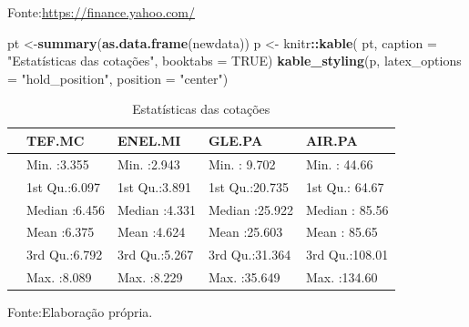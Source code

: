 \documentclass[
  12pt,
  a4paper,
  openany]{book}
\newenvironment{Shaded}{\begin{snugshade}}{\end{snugshade}}
\newcommand{\DataTypeTok}[1]{\textcolor[rgb]{0.13,0.29,0.53}{#1}}
\newcommand{\KeywordTok}[1]{\textcolor[rgb]{0.13,0.29,0.53}{\textbf{#1}}}
\newcommand{\NormalTok}[1]{#1}
\newcommand{\OperatorTok}[1]{\textcolor[rgb]{0.81,0.36,0.00}{\textbf{#1}}}
\newcommand{\OtherTok}[1]{\textcolor[rgb]{0.56,0.35,0.01}{#1}}
\newcommand{\StringTok}[1]{\textcolor[rgb]{0.31,0.60,0.02}{#1}}
\begin{document}
Fonte:\url{https://finance.yahoo.com/}

\justifying
\bigskip
\scriptsize

\begin{Shaded}
\begin{Highlighting}[]
\NormalTok{pt \textless{}{-}}\KeywordTok{summary}\NormalTok{(}\KeywordTok{as.data.frame}\NormalTok{(newdata))}
\NormalTok{p \textless{}{-}}\StringTok{ }\NormalTok{knitr}\OperatorTok{::}\KeywordTok{kable}\NormalTok{(}
\NormalTok{  pt, }\DataTypeTok{caption =} \StringTok{"Estatísticas das cotações"}\NormalTok{,}
  \DataTypeTok{booktabs =} \OtherTok{TRUE}\NormalTok{)}
\KeywordTok{kable\_styling}\NormalTok{(p, }\DataTypeTok{latex\_options =} \StringTok{"hold\_position"}\NormalTok{, }\DataTypeTok{position =} \StringTok{"center"}\NormalTok{)}
\end{Highlighting}
\end{Shaded}

\begin{table}[!h]

\caption{\label{tab:unnamed-chunk-6}Estatísticas das cotações}
\centering
\begin{tabular}[t]{lllll}
\toprule
  &     TEF.MC &    ENEL.MI &     GLE.PA &     AIR.PA\\
\midrule
 & Min.   :3.355 & Min.   :2.943 & Min.   : 9.702 & Min.   : 44.66\\
 & 1st Qu.:6.097 & 1st Qu.:3.891 & 1st Qu.:20.735 & 1st Qu.: 64.67\\
 & Median :6.456 & Median :4.331 & Median :25.922 & Median : 85.56\\
 & Mean   :6.375 & Mean   :4.624 & Mean   :25.603 & Mean   : 85.65\\
 & 3rd Qu.:6.792 & 3rd Qu.:5.267 & 3rd Qu.:31.364 & 3rd Qu.:108.01\\
\addlinespace
 & Max.   :8.089 & Max.   :8.229 & Max.   :35.649 & Max.   :134.60\\
\bottomrule
\end{tabular}
\end{table}
\normalsize
\FloatBarrier
\centering

Fonte:Elaboração própria.

\justifying
\bigskip
\scriptsize
\end{document}
